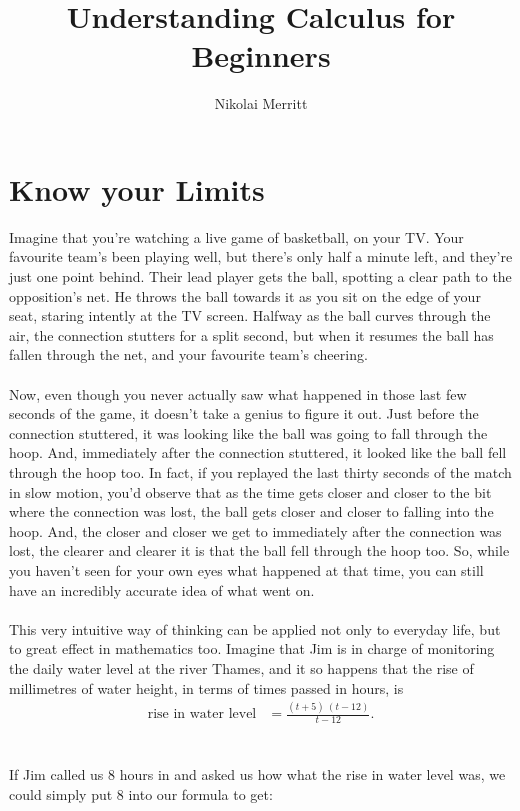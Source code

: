 \documentclass[11pt]{article}
\author{Nikolai Merritt}
\title{Understanding Calculus for Beginners}
\date{\vspace{-5ex}}
\numberwithin{equation}{section}
\begin{document}
\maketitle

\newpage
\section{Know your Limits}
Imagine that you're watching a live game of basketball, on your TV. Your favourite team's been playing well, but there's only half a minute left, and they're just one point behind. Their lead player gets the ball, spotting a clear path to the opposition's net. He throws the ball towards it as you sit on the edge of your seat, staring intently at the TV screen. Halfway as the ball curves through the air, the connection stutters for a split second, but when it resumes the ball has fallen through the net, and your favourite team's cheering. 
\\ \\
Now, even though you never actually saw what happened in those last few seconds of the game, it doesn't take a genius to figure it out. Just before the connection stuttered, it was looking like the ball was going to fall through the hoop. And, immediately after the connection stuttered, it looked like the ball fell through the hoop too. In fact, if you replayed the last thirty seconds of the match in slow motion, you'd observe that as the time gets closer and closer to the bit where the connection was lost, the ball gets closer and closer to falling into the hoop. And, the closer and closer we get to immediately after the connection was lost, the clearer and clearer it is that the ball fell through the hoop too. So, while you haven't seen for your own eyes what happened at that time, you can still have an incredibly accurate idea of what went on.  
\\ \\
This very intuitive way of thinking can be applied not only to everyday life, but to great effect in mathematics too. Imagine that Jim is in charge of monitoring the daily water level at the river Thames, and it so happens that the rise of millimetres of water height, in terms of times passed in hours, is
\begin{align*}
\textrm{rise in water level} &= \frac{(t + 5) \ (t - 12)}{t - 12}.
\end{align*}
\\ \\
If Jim called us 8 hours in and asked us how what the rise in water level was, we could simply put 8 into our formula to get:
\end{document}
